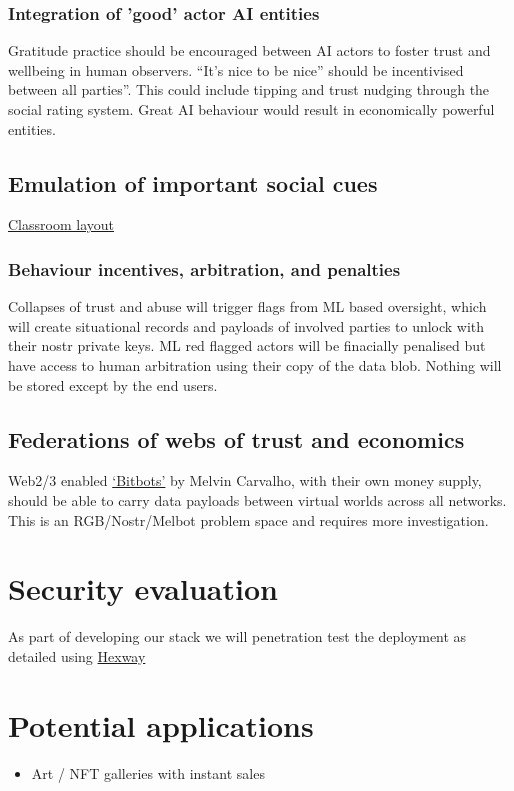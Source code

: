 \subsubsection{Integration of 'good' actor AI entities}
Gratitude practice should be encouraged between AI actors to foster trust and wellbeing in human observers. ``It's nice to be nice'' should be incentivised between all parties''. This could include tipping and trust nudging through the social rating system. Great AI behaviour would result in economically powerful entities.
\subsection{Emulation of important social cues}
\href{https://www.cleverclassroomsdesign.co.uk/general-5}{Classroom layout}
\subsubsection{Behaviour incentives, arbitration, and penalties}
Collapses of trust and abuse will trigger flags from ML based oversight, which will create situational records and payloads of involved parties to unlock with their nostr private keys. ML red flagged actors will be finacially penalised but have access to human arbitration using their copy of the data blob. Nothing will be stored except by the end users.
\subsection{Federations of webs of trust and economics}
Web2/3 enabled \href{https://bitbots.org}{`Bitbots'} by Melvin Carvalho, with their own money supply, should be able to carry data payloads between virtual worlds across all networks. This is an RGB/Nostr/Melbot problem space and requires more investigation. 
\section{Security evaluation}
As part of developing our stack we will penetration test the deployment as detailed using \href{https://hexway.io/}{Hexway}
\section{Potential applications }
\begin{itemize}
\item Art / NFT galleries with instant sales
\end{itemize}

